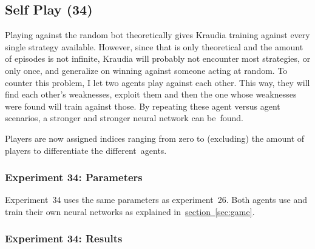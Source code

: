 \documentclass[a4paper,titlepage]{article}
\begin{document}
\subsection{Self Play (34)}

Playing against the random bot theoretically gives Kraudia training against every single strategy available. However, since that is only theoretical and the amount of episodes is not infinite, Kraudia will probably not encounter most strategies, or only once, and generalize on winning against someone acting at random. To counter this problem, I let two agents play against each other. This way, they will find each other's weaknesses, exploit them and then the one whose weaknesses were found will train against those. By repeating these agent versus agent scenarios, a stronger and stronger neural network can be~found.

Players are now assigned indices ranging from zero to (excluding) the amount of players to differentiate the different~agents.

\subsubsection*{Experiment 34: Parameters}

Experiment~34 uses the same parameters as experiment~26. Both agents use and train their own neural networks as explained in~\hyperref[sec:game]{section~\ref*{sec:game}}.

\subsubsection*{Experiment 34: Results}
\end{document}
